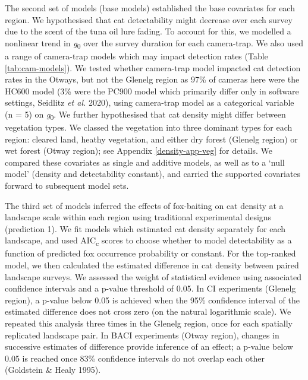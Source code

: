 \documentclass[preprint, 3p, authoryear]{elsarticle} %
\begin{document}
The second set of models (base models) established the base covariates for each region. We hypothesised that cat detectability might decrease over each survey due to the scent of the tuna oil lure fading. To account for this, we modelled a nonlinear trend in \emph{g}\textsubscript{0} over the survey duration for each camera-trap. We also used a range of camera-trap models which may impact detection rates (Table \ref{tab:cam-models}). We tested whether camera-trap model impacted cat detection rates in the Otways, but not the Glenelg region as 97\% of cameras here were the HC600 model (3\% were the PC900 model which primarily differ only in software settings, Seidlitz \emph{et al.} 2020), using camera-trap model as a categorical variable (n = 5) on \emph{g}\textsubscript{0}. We further hypothesised that cat density might differ between vegetation types. We classed the vegetation into three dominant types for each region: cleared land, heathy vegetation, and either dry forest (Glenelg region) or wet forest (Otway region); see Appendix \ref{density-app-veg} for details. We compared these covariates as single and additive models, as well as to a `null model' (density and detectability constant), and carried the supported covariates forward to subsequent model sets.

The third set of models inferred the effects of fox-baiting on cat density at a landscape scale within each region using traditional experimental designs (prediction 1). We fit models which estimated cat density separately for each landscape, and used AIC\textsubscript{c} scores to choose whether to model detectability as a function of predicted fox occurrence probability or constant. For the top-ranked model, we then calculated the estimated difference in cat density between paired landscape surveys. We assessed the weight of statistical evidence using associated confidence intervals and a p-value threshold of 0.05. In CI experiments (Glenelg region), a p-value below 0.05 is achieved when the 95\% confidence interval of the estimated difference does not cross zero (on the natural logarithmic scale). We repeated this analysis three times in the Glenelg region, once for each spatially replicated landscape pair. In BACI experiments (Otway region), changes in successive estimates of difference provide inference of an effect; a p-value below 0.05 is reached once 83\% confidence intervals do not overlap each other (Goldstein \& Healy 1995).
\end{document}
